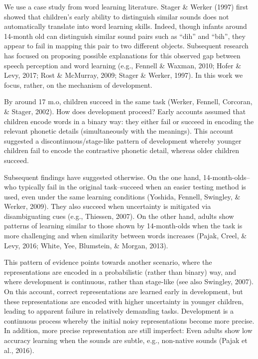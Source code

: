 \documentclass[10pt, letterpaper]{article}
\begin{document}
We use a case study from word learning literature. Stager \& Werker
(1997) first showed that children's early ability to distinguish similar
sounds does not automatically translate into word learning skills.
Indeed, though infants around 14-month old can distinguish similar sound
pairs such as ``dih'' and ``bih'', they appear to fail in mapping this
pair to two different objects. Subsequent research has focused on
proposing possible explanations for this observed gap between speech
perception and word learning (e.g., Fennell \& Waxman, 2010; Hofer \&
Levy, 2017; Rost \& McMurray, 2009; Stager \& Werker, 1997). In this
work we focus, rather, on the mechanism of development.

By around 17 m.o, children succeed in the same task (Werker, Fennell,
Corcoran, \& Stager, 2002). How does development proceed? Early accounts
assumed that children encode words in a binary way: they either fail or
succeed in encoding the relevant phonetic details (simultaneously with
the meanings). This account suggested a discontinuous/stage-like pattern
of development whereby younger children fail to encode the contrastive
phonetic detail, whereas older children succeed.

Subsequent findings have suggested otherwise. On the one hand,
14-month-olds--who typically fail in the original task--succeed when an
easier testing method is used, even under the same learning conditions
(Yoshida, Fennell, Swingley, \& Werker, 2009). They also succeed when
uncertainty is mitigated via disambiguating cues (e.g., Thiessen, 2007).
On the other hand, adults show patterns of learning similar to those
shown by 14-month-olds when the task is more challenging and when
similarity between words increases (Pajak, Creel, \& Levy, 2016; White,
Yee, Blumstein, \& Morgan, 2013).

This pattern of evidence points towards another scenario, where the
representations are encoded in a probabilistic (rather than binary) way,
and where development is continuous, rather than stage-like (see also
Swingley, 2007). On this account, correct representations are learned
early in development, but these representations are encoded with higher
uncertainty in younger children, leading to apparent failure in
relatively demanding tasks. Development is a continuous process whereby
the initial noisy representations become more precise. In addition, more
precise representation are still imperfect: Even adults show low
accuracy learning when the sounds are subtle, e.g., non-native sounds
(Pajak et al., 2016).
\end{document}
